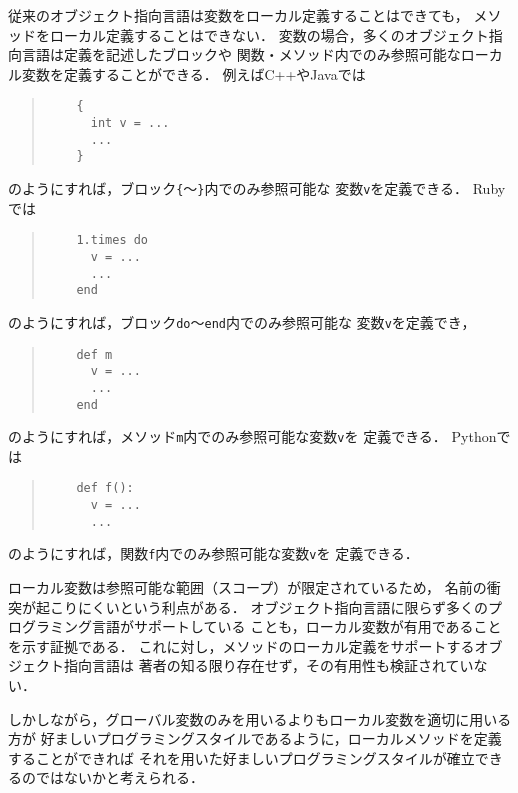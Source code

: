 \documentclass[a4paper,11pt,dvipdfmx]{jreport}
\begin{document}
従来のオブジェクト指向言語は変数をローカル定義することはできても，
メソッドをローカル定義することはできない．
変数の場合，多くのオブジェクト指向言語は定義を記述したブロックや
関数・メソッド内でのみ参照可能なローカル変数を定義することができる．
例えばC++やJavaでは
\begin{quote}
	\begin{verbatim}
	{
	  int v = ...
	  ...
	}
	\end{verbatim}
\end{quote}
のようにすれば，ブロック\verb|{|～\verb|}|内でのみ参照可能な
変数\verb|v|を定義できる．
Rubyでは
\begin{quote}
	\begin{verbatim}
	1.times do
	  v = ...
	  ...
	end
	\end{verbatim}
\end{quote}
のようにすれば，ブロック\verb|do|～\verb|end|内でのみ参照可能な
変数\verb|v|を定義でき，
\begin{quote}
	\begin{verbatim}
	def m
	  v = ...
	  ...
	end
	\end{verbatim}
\end{quote}
のようにすれば，メソッド\verb|m|内でのみ参照可能な変数\verb|v|を
定義できる．
Pythonでは
\begin{quote}
	\begin{verbatim}
	def f():
	  v = ...
	  ...
	\end{verbatim}
\end{quote}
のようにすれば，関数\verb|f|内でのみ参照可能な変数\verb|v|を
定義できる．

ローカル変数は参照可能な範囲（スコープ）が限定されているため，
名前の衝突が起こりにくいという利点がある．
オブジェクト指向言語に限らず多くのプログラミング言語がサポートしている
ことも，ローカル変数が有用であることを示す証拠である．
これに対し，メソッドのローカル定義をサポートするオブジェクト指向言語は
著者の知る限り存在せず，その有用性も検証されていない．

しかしながら，グローバル変数のみを用いるよりもローカル変数を適切に用いる方が
好ましいプログラミングスタイルであるように，ローカルメソッドを定義することができれば
それを用いた好ましいプログラミングスタイルが確立できるのではないかと考えられる．
\end{document}
